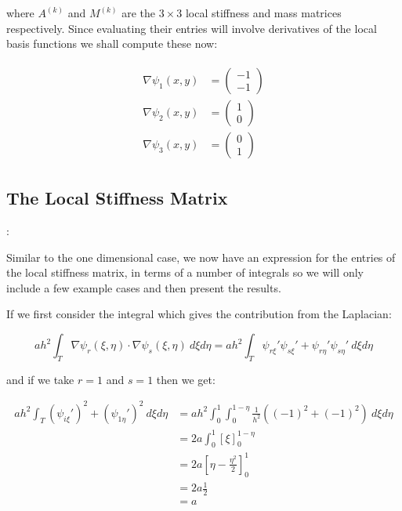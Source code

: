 where $A^{(k)}$ and $M^{(k)}$ are the $3 \times 3$ local stiffness and mass
matrices respectively. Since evaluating their entries will involve derivatives
of the local basis functions we shall compute these now:

\begin{align}
    \begin{split}
        \nabla\psi_1(x, y) &= \left(\begin{array}{c} -1 \\ -1 \end{array}\right) \\
        \nabla\psi_2(x, y) &= \left(\begin{array}{c} 1 \\ 0 \end{array}\right) \\
        \nabla\psi_3(x, y) &= \left(\begin{array}{c} 0 \\ 1 \end{array}\right)
    \end{split}
\end{align}

\subsection{The Local Stiffness Matrix}:\label{sec:twod-deterministic-local-stiffness}

Similar to the one dimensional case, we now have an expression for the entries
of the local stiffness matrix, in terms of a number of integrals
 so we will only include a few
example cases and then present the results.

If we first consider the integral which gives the contribution from the
Laplacian:

\begin{equation*}
    ah^2\int_T\nabla\psi_r(\xi,\eta)\cdot\nabla\psi_s(\xi,\eta)\ d\xi d\eta =
    ah^2\int_T\psi_{r\xi}'\psi_{s\xi}' + \psi_{r\eta}'\psi_{s\eta}'\ d\xi d\eta
\end{equation*}

and if we take $r = 1$ and $s = 1$ then we get:

\begin{align*}
    ah^2\int_T(\psi_{i\xi}')^2 + (\psi_{1\eta}')^2\ d\xi d\eta
    &= ah^2\int_0^1\int_0^{1 - \eta}\frac{1}{h^2}((-1)^2 + (-1)^2)\ d\xi d\eta \\
    &= 2a\int_0^1\left[\xi\right]_0^{1 - \eta} \\
    &= 2a\left[\eta - \frac{\eta^2}{2}\right]_0^1 \\
    &= 2a\frac{1}{2} \\
    &= a
\end{align*}

